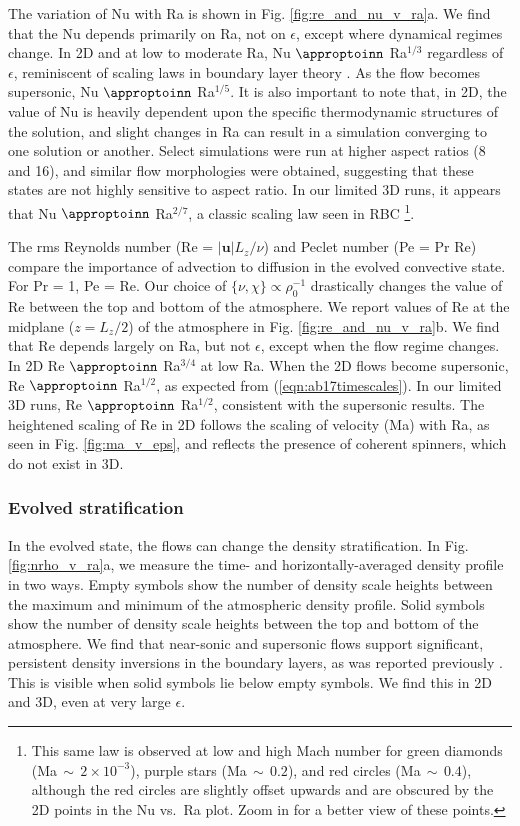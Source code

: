 The variation of Nu with Ra is shown in Fig. \ref{fig:re_and_nu_v_ra}a.  
We find that the Nu depends primarily on Ra, not on $\epsilon$, except where dynamical regimes change.
In 2D and at low to moderate Ra, Nu $\appropto$ Ra$^{1/3}$ regardless of $\epsilon$, reminiscent of scaling laws in \RB boundary layer theory \citep{grossman&lohse2000, ahlers&all2009, king&all2012}.
As the flow becomes supersonic,  Nu $\appropto$ Ra$^{1/5}$.
It is also important to note that, in 2D, the value of Nu is heavily dependent upon the specific thermodynamic structures of the solution, and slight changes in Ra can result in a simulation converging to one solution or another. 
Select simulations were run at higher aspect ratios (8 and 16), and similar flow morphologies were obtained, suggesting that these states are not highly sensitive to aspect ratio.
In our limited 3D runs, it appears that Nu $\appropto$ Ra$^{2/7}$, a classic scaling law seen in RBC \citep{johnston&doering2009}\footnote{
This same law is observed at low and high Mach number for green diamonds (Ma$\,\sim\,2\times 10^{-3}$), purple stars (Ma$\,\sim\,0.2$), and red circles (Ma$\,\sim\,0.4$), although the red circles are slightly offset upwards and are obscured by the 2D points in the Nu vs.~Ra plot. 
Zoom in for a better view of these points.}.

The rms Reynolds number (Re = $|\bm{u}|L_z/\nu$) and Peclet number (Pe = Pr Re) compare the importance of advection to diffusion in the evolved convective state.  
For Pr = 1, Pe = Re.  
Our choice of $\{\nu,\chi\}\propto \rho_0^{-1}$ drastically changes the value of Re between the top and bottom of the atmosphere.  
We report values of Re at the midplane ($z=L_z/2$) of the atmosphere in Fig. \ref{fig:re_and_nu_v_ra}b.  
We find that Re depends largely on Ra, but not $\epsilon$, except when the flow regime changes.
In 2D Re $\appropto$ Ra$^{3/4}$ at low Ra.    
When the 2D flows become supersonic,  Re $\appropto$ Ra$^{1/2}$, as expected from (\ref{eqn:ab17timescales}).
In our limited 3D runs, Re $\appropto$ Ra$^{1/2}$, consistent with the supersonic results.
The heightened scaling of Re in 2D follows the scaling of velocity (Ma) with Ra, as seen in Fig. \ref{fig:ma_v_eps}, and reflects the presence of coherent spinners, which do not exist in 3D.

\subsubsection{Evolved stratification}

In the evolved state, the flows can change the density stratification.
In Fig. \ref{fig:nrho_v_ra}a, we measure the time- and horizontally-averaged density profile in two ways. 
Empty symbols show the number of density scale heights between the maximum and minimum of the atmospheric density profile.  
Solid symbols show the number of density scale heights between the top and bottom of the atmosphere. 
We find that near-sonic and supersonic flows support significant, persistent density inversions in the boundary layers, as was reported previously \cite{brandenburg&all2005}.  
This is visible when solid symbols lie below empty symbols.  
We find this in 2D and 3D, even at very large $\epsilon$.  

